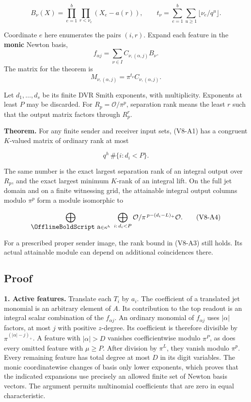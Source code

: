 \documentclass[11pt,a4paper]{article}
\renewcommand{\boldsymbol}[1]{\mathord{\mathchoice
  {\hbox{\OfflineBoldText #1}}{\hbox{\OfflineBoldText #1}}
  {\hbox{\OfflineBoldScript #1}}{\hbox{\OfflineBoldScriptScript #1}}}}
\begin{document}
\[
 B_\nu(X)=\prod_{e=1}^b\prod_{r<\nu_e}(X_e-a(r)),\qquad
 t_\nu=\sum_{e=1}^b\sum_{u\ge1}\lfloor\nu_e/q^u\rfloor.
\]

Coordinate \(e\) here enumerates the pairs \((i,r)\). Expand each
feature in the \textbf{monic} Newton basis, \[
 f_{\alpha j}=\sum_{\nu\in I} C_{\nu,(\alpha,j)} B_\nu.
\] The matrix for the theorem is \[
                 M_{\nu,(\alpha,j)}=\pi^{t_\nu} C_{\nu,(\alpha,j)}.
                 \tag{V8-A2}
\]

Let \(d_1,\ldots,d_s\) be its finite DVR Smith exponents, with
multiplicity. Exponents at least \(P\) may be discarded. For
\(R_p=\mathcal O/\pi^p\), separation rank means the least \(r\) such
that the output matrix factors through \(R_p^r\).

\textbf{Theorem.} For any finite sender and receiver input sets, (V8-A1)
has a congruent \(K\)-valued matrix of ordinary rank at most

\[
                        q^h\,\#\{i:d_i<P\}.                       \tag{V8-A3}
\]

The same number is the exact largest separation rank of an integral
output over \(R_p\), and the exact largest minimum \(K\)-rank of an
integral lift. On the full jet domain and on a finite witnessing grid,
the attainable integral output columns modulo \(\pi^p\) form a module
isomorphic to

\[
 \bigoplus_{\boldsymbol a\in\kappa^h}
 \ \bigoplus_{i:\,d_i<P}\mathcal O/\pi^{\,p-(d_i-L)_+}\mathcal O .
                                                                    \tag{V8-A4}
\]

For a prescribed proper sender image, the rank bound in (V8-A3) still
holds. Its actual attainable module can depend on additional
coincidences there.

\subsection{Proof}\label{v8-proof}

\textbf{1. Active features.} Translate each \(T_i\) by \(a_i\). The
coefficient of a translated jet monomial is an arbitrary element of
\(A\). Its contribution to the top readout is an integral scalar
combination of the \(f_{\alpha j}\). An ordinary monomial of
\(f_{\alpha j}\) uses \(|\alpha|\) factors, at most \(j\) with positive
\(z\)-degree. Its coefficient is therefore divisible by
\(\pi^{(|\alpha|-j)_+}\). A feature with \(|\alpha|>D\) vanishes
coefficientwise modulo \(\pi^P\), as does every omitted feature with
\(\mu\ge P\). After division by \(\pi^L\), they vanish modulo \(\pi^p\).
Every remaining feature has total degree at most \(D\) in its digit
variables. The monic coordinatewise changes of basis only lower
exponents, which proves that the indicated expansions use precisely an
allowed finite set of Newton basis vectors. The argument permits
multinomial coefficients that are zero in equal characteristic.
\end{document}
